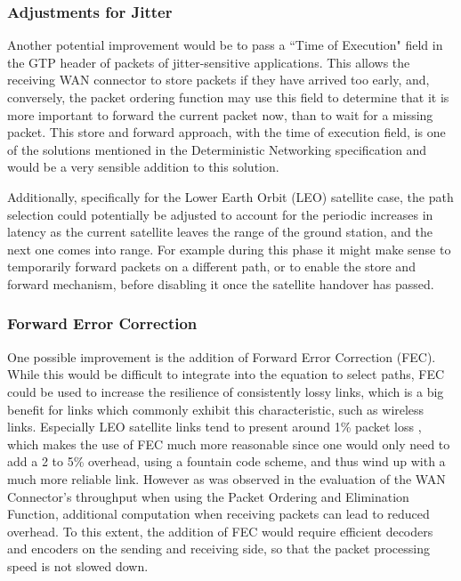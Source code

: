 \subsubsection{Adjustments for Jitter}

Another potential improvement would be to pass a “Time of Execution" field in the GTP header of packets of jitter-sensitive applications. This allows the receiving WAN connector to store packets if they have arrived too early, and, conversely, the packet ordering function may use this field to determine that it is more important to forward the current packet now, than to wait for a missing packet. This store and forward approach, with the time of execution field, is one of the solutions mentioned in the Deterministic Networking specification and would be a very sensible addition to this solution.

Additionally, specifically for the Lower Earth Orbit (LEO) satellite case, the path selection could potentially be adjusted to account for the periodic increases in latency as the current satellite leaves the range of the ground station, and the next one comes into range. For example during this phase it might make sense to temporarily forward packets on a different path, or to enable the store and forward mechanism, before disabling it once the satellite handover has passed.

\subsubsection{Forward Error Correction}

One possible improvement is the addition of Forward Error Correction (FEC). While this would be difficult to integrate into the equation to select paths, FEC could be used to increase the resilience of consistently lossy links, which is a big benefit for links which commonly exhibit this characteristic, such as wireless links. Especially LEO satellite links tend to present around 1\% packet loss \cite{deutschmann2022broadband}, which makes the use of FEC much more reasonable since one would only need to add a 2 to 5\% overhead, using a fountain code scheme, and thus wind up with a much more reliable link. However as was observed in the evaluation of the WAN Connector's throughput when using the Packet Ordering and Elimination Function, additional computation when receiving packets can lead to reduced overhead. To this extent, the addition of FEC would require efficient decoders and encoders on the sending and receiving side, so that the packet processing speed is not slowed down.

